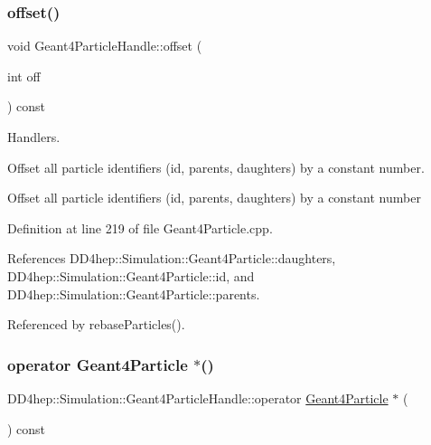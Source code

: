 \hypertarget{class_d_d4hep_1_1_simulation_1_1_geant4_particle_handle_a8a878f870705068d67cdc051f09257ad}{}\label{class_d_d4hep_1_1_simulation_1_1_geant4_particle_handle_a8a878f870705068d67cdc051f09257ad} 
\subsubsection{\texorpdfstring{offset()}{offset()}}
{\footnotesize\ttfamily void Geant4\+Particle\+Handle\+::offset (\begin{DoxyParamCaption}\item[{int}]{off }\end{DoxyParamCaption}) const}



Handlers. 

Offset all particle identifiers (id, parents, daughters) by a constant number.

Offset all particle identifiers (id, parents, daughters) by a constant number 

Definition at line 219 of file Geant4\+Particle.\+cpp.



References D\+D4hep\+::\+Simulation\+::\+Geant4\+Particle\+::daughters, D\+D4hep\+::\+Simulation\+::\+Geant4\+Particle\+::id, and D\+D4hep\+::\+Simulation\+::\+Geant4\+Particle\+::parents.



Referenced by rebase\+Particles().

\hypertarget{class_d_d4hep_1_1_simulation_1_1_geant4_particle_handle_a0b41fbcc357633d0a56348a41f067d1b}{}\label{class_d_d4hep_1_1_simulation_1_1_geant4_particle_handle_a0b41fbcc357633d0a56348a41f067d1b} 
\subsubsection{\texorpdfstring{operator Geant4\+Particle $\ast$()}{operator Geant4Particle *()}}
{\footnotesize\ttfamily D\+D4hep\+::\+Simulation\+::\+Geant4\+Particle\+Handle\+::operator \hyperlink{class_d_d4hep_1_1_simulation_1_1_geant4_particle}{Geant4\+Particle} $\ast$ (\begin{DoxyParamCaption}{ }\end{DoxyParamCaption}) const\hspace{0.3cm}{\ttfamily [inline]}}



